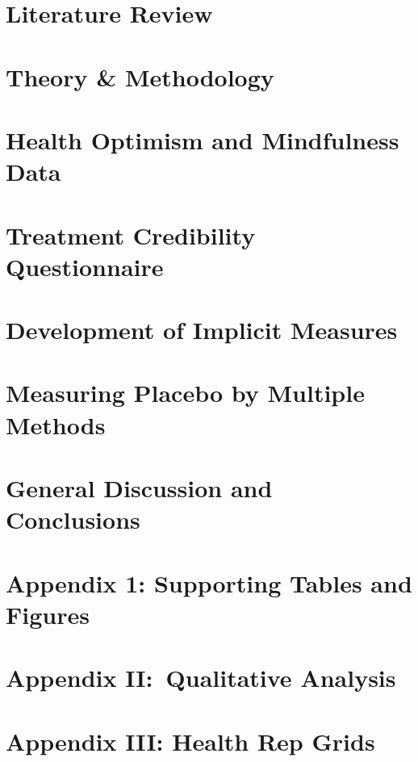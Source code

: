 \documentclass[apsych,phd]{uccthesis}
\begin{document}
\label{cha:intr-rese}


\chapter{Literature Review}
\label{cha:literature-review}


\chapter{Theory \& Methodology}
\label{cha:methodology}


\chapter{Health Optimism and Mindfulness Data}
\label{cha:health-for-thesis}


\chapter{Treatment Credibility Questionnaire}
\label{cha:tcq-thesis}


\chapter{Development of Implicit Measures}
\label{cha:devel-impl-meas}



\chapter{Measuring Placebo by Multiple Methods}
\label{cha:primary-research}


\chapter{General Discussion and Conclusions}
\label{cha:general-discussion}

\appendix
\chapter{Appendix 1: Supporting Tables and Figures}
\label{cha:append-1:-supp}


\chapter{Appendix II:\ Qualitative Analysis}
\label{cha:append-ii:-qual}



\chapter{Appendix III: Health Rep Grids }
\label{cha:append-iii:-rep}


\end{document}
